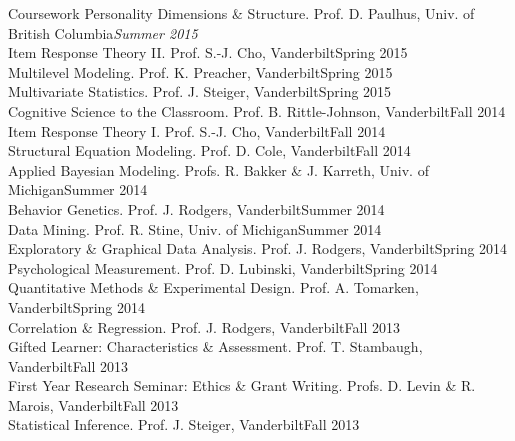 \documentclass {resume}
\begin{document}
\begin{rSection}{\textrm{Coursework}}
Personality Dimensions \& Structure.  Prof. D. Paulhus, Univ. of British Columbia\hfill  {\textit{Summer 2015}}\smallskip\\
Item Response Theory \textrm{II}. Prof. S.-J. Cho, Vanderbilt\hfill  {Spring 2015}\smallskip\\
Multilevel Modeling. Prof. K. Preacher, Vanderbilt\hfill  {Spring 2015}\smallskip\\
Multivariate Statistics. Prof. J. Steiger, Vanderbilt\hfill  {Spring 2015}\smallskip\\
Cognitive Science to the Classroom. Prof. B. Rittle-Johnson, Vanderbilt\hfill  {Fall 2014}\smallskip\\
Item Response Theory \textrm{I}. Prof. S.-J. Cho, Vanderbilt\hfill  {Fall 2014}\smallskip\\
Structural Equation Modeling. Prof. D. Cole, Vanderbilt\hfill  {Fall 2014}\smallskip\\%
Applied Bayesian Modeling. Profs. R. Bakker \& J. Karreth, Univ. of Michigan\hfill  {Summer 2014}\smallskip\\
Behavior Genetics. Prof. J. Rodgers, Vanderbilt\hfill  {Summer 2014}\smallskip\\
Data Mining. Prof. R. Stine, Univ. of Michigan\hfill  {Summer 2014}\smallskip\\
Exploratory \& Graphical Data Analysis. Prof. J. Rodgers, Vanderbilt\hfill  {Spring 2014}\smallskip\\
Psychological Measurement. Prof. D. Lubinski, Vanderbilt\hfill  {Spring 2014}\smallskip\\
Quantitative Methods \& Experimental Design. Prof. A. Tomarken, Vanderbilt\hfill  {Spring 2014}\smallskip\\
Correlation \& Regression. Prof. J. Rodgers, Vanderbilt\hfill  {Fall 2013}\smallskip\\
Gifted Learner: Characteristics \& Assessment. Prof. T. Stambaugh, Vanderbilt\hfill  {Fall 2013}\smallskip\\
First Year Research Seminar: Ethics \& Grant Writing. Profs. D. Levin \& R. Marois, Vanderbilt\hfill  {Fall 2013}\smallskip\\
Statistical Inference. Prof. J. Steiger, Vanderbilt\hfill  {Fall 2013}\smallskip\\

\end{rSection}
\end{document}
